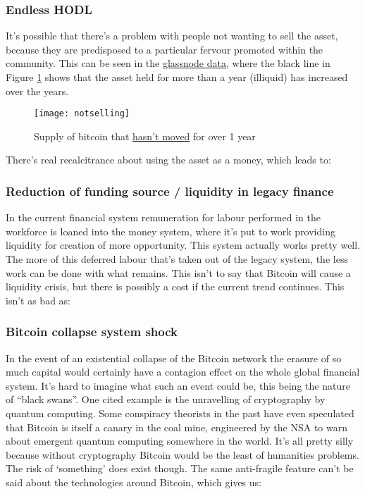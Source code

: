 \subsubsection{Endless HODL}
It's possible that there's a problem with people not wanting to sell the asset, because they are predisposed to a particular fervour promoted within the community. This can be seen in the \href{https://en.macromicro.me/charts/32355/bitcoin-supply-last-active-1plus-years-ago}{glassnode data}, where the black line in Figure \ref{fig:notselling} shows that the asset held for more than a year (illiquid) has increased over the years.
\begin{figure}
  \centering
    \texttt{[image: notselling]}
  \caption{Supply of bitcoin that \href{https://en.macromicro.me/charts/32355/bitcoin-supply-last-active-1plus-years-ago}{hasn't moved} for over 1 year}
  \label{fig:notselling}
\end{figure}
There's real recalcitrance about using the asset as a money, which leads to:
\subsubsection{Reduction of funding source / liquidity in legacy finance}
In the current financial system remuneration for labour performed in the workforce is loaned into the money system, where it's put to work providing liquidity for creation of more opportunity. This system actually works pretty well. The more of this deferred labour that's taken out of the legacy system, the less work can be done with what remains. This isn't to say that Bitcoin will cause a liquidity crisis, but there is possibly a cost if the current trend continues. This isn't as bad as:
\subsubsection{Bitcoin collapse system shock}
In the event of an existential collapse of the Bitcoin network the erasure of so much capital would certainly have a contagion effect on the whole global financial system. It's hard to imagine what such an event could be, this being the nature of ``black swans''. One cited example is the unravelling of cryptography by quantum computing. Some conspiracy theorists in the past have even speculated that Bitcoin is itself a canary in the coal mine, engineered by the NSA to warn about emergent quantum computing somewhere in the world. It's all pretty silly because without cryptography Bitcoin would be the least of humanities problems. The risk of `something' does exist though. The same anti-fragile feature can't be said about the technologies around Bitcoin, which gives us:
